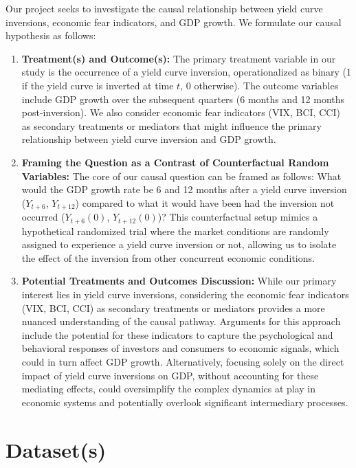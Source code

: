 \documentclass[11pt]{article}
\begin{document}
Our project seeks to investigate the causal relationship between yield curve inversions, economic fear indicators, and GDP growth. We formulate our causal hypothesis as follows:

\begin{enumerate}[label={(\alph*)}]
\item \textbf{Treatment(s) and Outcome(s):} 
  The primary treatment variable in our study is the occurrence of a yield curve inversion, operationalized as binary (1 if the yield curve is inverted at time \( t \), 0 otherwise). The outcome variables include GDP growth over the subsequent quarters (6 months and 12 months post-inversion). We also consider economic fear indicators (VIX, BCI, CCI) as secondary treatments or mediators that might influence the primary relationship between yield curve inversion and GDP growth.

\item \textbf{Framing the Question as a Contrast of Counterfactual Random Variables:} 
  The core of our causal question can be framed as follows: What would the GDP growth rate be 6 and 12 months after a yield curve inversion (\( Y_{t+6} \), \( Y_{t+12} \)) compared to what it would have been had the inversion not occurred (\( Y_{t+6}(0) \), \( Y_{t+12}(0) \))? This counterfactual setup mimics a hypothetical randomized trial where the market conditions are randomly assigned to experience a yield curve inversion or not, allowing us to isolate the effect of the inversion from other concurrent economic conditions.

\item \textbf{Potential Treatments and Outcomes Discussion:}
  While our primary interest lies in yield curve inversions, considering the economic fear indicators (VIX, BCI, CCI) as secondary treatments or mediators provides a more nuanced understanding of the causal pathway. Arguments for this approach include the potential for these indicators to capture the psychological and behavioral responses of investors and consumers to economic signals, which could in turn affect GDP growth. Alternatively, focusing solely on the direct impact of yield curve inversions on GDP, without accounting for these mediating effects, could oversimplify the complex dynamics at play in economic systems and potentially overlook significant intermediary processes.
\end{enumerate}

\section{Dataset(s)}
\end{document}

